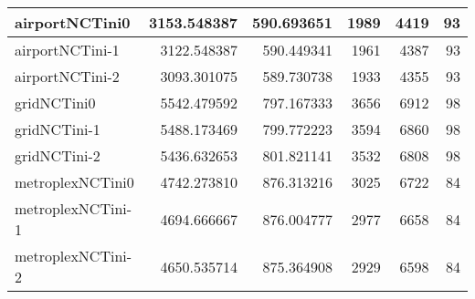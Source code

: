\begin{longtable}{|l|r|r|r|r|r|}
airportNCTini0 & 3153.548387 & 590.693651 & 1989 & 4419 & 93 \\ \hline
airportNCTini-1 & 3122.548387 & 590.449341 & 1961 & 4387 & 93 \\ \hline
airportNCTini-2 & 3093.301075 & 589.730738 & 1933 & 4355 & 93 \\ \hline
gridNCTini0 & 5542.479592 & 797.167333 & 3656 & 6912 & 98 \\ \hline
gridNCTini-1 & 5488.173469 & 799.772223 & 3594 & 6860 & 98 \\ \hline
gridNCTini-2 & 5436.632653 & 801.821141 & 3532 & 6808 & 98 \\ \hline
metroplexNCTini0 & 4742.273810 & 876.313216 & 3025 & 6722 & 84 \\ \hline
metroplexNCTini-1 & 4694.666667 & 876.004777 & 2977 & 6658 & 84 \\ \hline
metroplexNCTini-2 & 4650.535714 & 875.364908 & 2929 & 6598 & 84 \\ \hline
\end{longtable}
